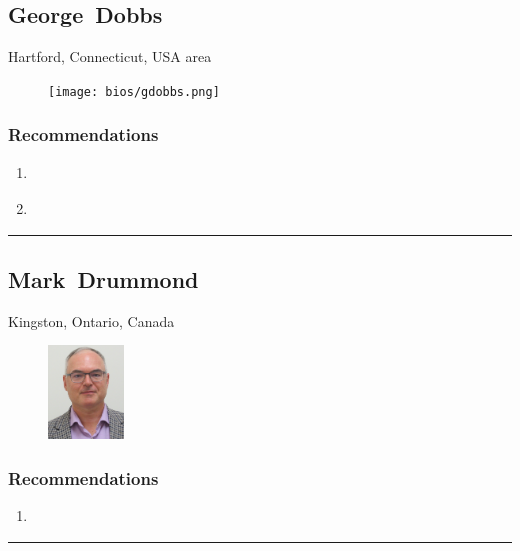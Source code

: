 \subsection{George~Dobbs} \textsf{Hartford, Connecticut, USA area} \par \setlength{\columnsep}{0pt} \begin{figure} \centering \texttt{[image: bios/gdobbs.png]} \end{figure}  \subsubsection{Recommendations}\begin{enumerate}
\item \cite{Cameron2005}
\item \cite{Hoffman1977}
\end{enumerate}\noindent\rule{\textwidth}{0.2pt}

\subsection{Mark~Drummond} \textsf{Kingston, Ontario, Canada} \par \setlength{\columnsep}{0pt} \begin{figure} \centering \includegraphics[width=0.18\textwidth]{bios/mdrummond.jpg} \end{figure}  \subsubsection{Recommendations}\begin{enumerate}
\item \cite{Bertocci2019a}
\end{enumerate}\noindent\rule{\textwidth}{0.2pt}

